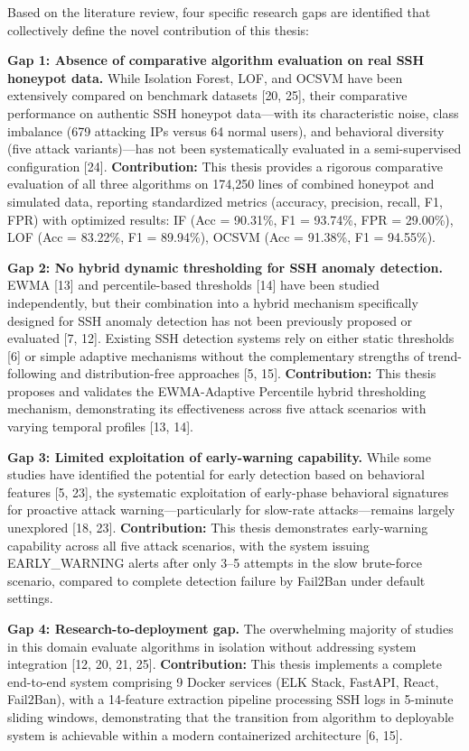 \documentclass[
  a4paper]{report}
\begin{document}
Based on the literature review, four specific research gaps are
identified that collectively define the novel contribution of this
thesis:

\textbf{Gap 1: Absence of comparative algorithm evaluation on real SSH
honeypot data.} While Isolation Forest, LOF, and OCSVM have been
extensively compared on benchmark datasets {[}20, 25{]}, their
comparative performance on authentic SSH honeypot data---with its
characteristic noise, class imbalance (679 attacking IPs versus 64
normal users), and behavioral diversity (five attack variants)---has not
been systematically evaluated in a semi-supervised configuration
{[}24{]}. \textbf{Contribution:} This thesis provides a rigorous
comparative evaluation of all three algorithms on 174,250 lines of
combined honeypot and simulated data, reporting standardized metrics
(accuracy, precision, recall, F1, FPR) with optimized results: IF (Acc =
90.31\%, F1 = 93.74\%, FPR = 29.00\%), LOF (Acc = 83.22\%, F1 =
89.94\%), OCSVM (Acc = 91.38\%, F1 = 94.55\%).

\textbf{Gap 2: No hybrid dynamic thresholding for SSH anomaly
detection.} EWMA {[}13{]} and percentile-based thresholds {[}14{]} have
been studied independently, but their combination into a hybrid
mechanism specifically designed for SSH anomaly detection has not been
previously proposed or evaluated {[}7, 12{]}. Existing SSH detection
systems rely on either static thresholds {[}6{]} or simple adaptive
mechanisms without the complementary strengths of trend-following and
distribution-free approaches {[}5, 15{]}. \textbf{Contribution:} This
thesis proposes and validates the EWMA-Adaptive Percentile hybrid
thresholding mechanism, demonstrating its effectiveness across five
attack scenarios with varying temporal profiles {[}13, 14{]}.

\textbf{Gap 3: Limited exploitation of early-warning capability.} While
some studies have identified the potential for early detection based on
behavioral features {[}5, 23{]}, the systematic exploitation of
early-phase behavioral signatures for proactive attack
warning---particularly for slow-rate attacks---remains largely
unexplored {[}18, 23{]}. \textbf{Contribution:} This thesis demonstrates
early-warning capability across all five attack scenarios, with the
system issuing EARLY\_WARNING alerts after only 3--5 attempts in the
slow brute-force scenario, compared to complete detection failure by
Fail2Ban under default settings.

\textbf{Gap 4: Research-to-deployment gap.} The overwhelming majority of
studies in this domain evaluate algorithms in isolation without
addressing system integration {[}12, 20, 21, 25{]}.
\textbf{Contribution:} This thesis implements a complete end-to-end
system comprising 9 Docker services (ELK Stack, FastAPI, React,
Fail2Ban), with a 14-feature extraction pipeline processing SSH logs in
5-minute sliding windows, demonstrating that the transition from
algorithm to deployable system is achievable within a modern
containerized architecture {[}6, 15{]}.
\end{document}
